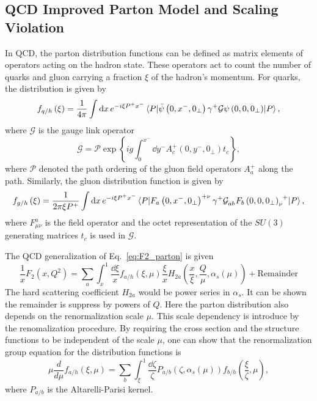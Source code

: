 \documentclass[../main.tex]{subfiles}
\begin{document}
\subsection{QCD Improved Parton Model and Scaling Violation}
\label{subsec:scaling_violation}
In QCD, the parton distribution functions can be defined as matrix elements of 
operators acting on the hadron state. These operators act to count the number of
quarks and gluon carrying a fraction $\xi$ of the hadron's momentum. For quarks,
the distribution is given by\cite{collins1989} 
\begin{equation}
	f_{q/h}\left(\xi\right) = \frac{1}{4\pi}\int \dd{x} e^{-i\xi P^{+} x^{-}} \mel{P}{\bar{\psi}\left(0,x^-,0_\perp\right)\gamma^+ \mathcal{G} \psi\left(0,0,0_\perp\right)}{P},
\end{equation}
where $\mathcal{G}$ is the gauge link operator
\begin{equation}
	\mathcal{G}=\mathcal{P} \exp \left\{ ig\int_0^{x^-}\dd{y^-} A_c^+ \left(0,y^-,0_\perp\right)t_c\right\},
\end{equation}
where $\mathcal{P}$ denoted the path ordering of the gluon field operators $A_a^+$
along the path. Similarly, the gluon distribution function is given by
\begin{equation}
	f_{g/h}\left(\xi\right) = \frac{1}{2\pi\xi P^+}\int \dd{x} e^{-i\xi P^{+} x^{-}} \mel{P}{\tensor{F_a\left(0,x^-,0_\perp\right)}{^+^\nu}\gamma^{+} \tensor{\mathcal{G}}{_a_b} \tensor{F_b\left(0,0,0_\perp\right)}{_\nu^+}}{P},
\end{equation}
where $F^a_{\mu\nu}$ is the field operator and the octet representation of the $SU(3)$
generating matrices $t_c$ is used in $\mathcal{G}$.


The QCD generalization of Eq.\ \ref{eq:F2_parton} is given 
\begin{equation}
\frac{1}{x}F_2\left(x,Q^2\right) = \sum_a \int_x^1 \frac{\dd{\xi}}{x}f_{a/h}\left(\xi,\mu\right)\frac{\xi}{x}H_{2a}\left( \frac{x}{\xi}, \frac{Q}{\mu}, \alpha_s\left(\mu\right)\right)
	+ \text{Remainder}
\end{equation}
The hard scattering coefficient $H_{2a}$ would be power series in $\alpha_s$. It
can be shown the remainder is suppress by powers of $Q$. Here the parton 
distribution also depends on the renormalization scale $\mu$. This scale 
dependency is introduce by the renomalization procedure. By requiring the cross 
section and the structure functions to be independent of the scale $\mu$,
one can show that the renormalization group equation for the distribution 
functions is
\begin{equation}
	\mu\frac{d}{d\mu}f_{a/h}\left(\xi,\mu\right)=\sum_b \int_\xi^1 \frac{\dd{\zeta}}{\zeta} P_{a/b}\left(\zeta,\alpha_s\left(\mu\right)\right) f_{b/h}\left(\frac{\xi}{\zeta},\mu\right),
\end{equation}
where $P_{a/b}$ is the Altarelli-Parisi kernel\cite{altarelli1977}. 
\end{document}
